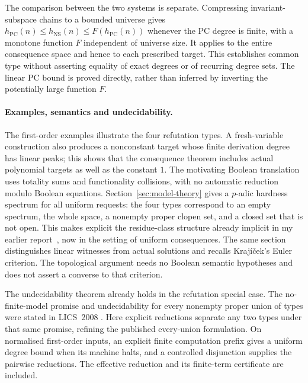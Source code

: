 \documentclass[11pt,a4paper]{article}
\theoremstyle{definition}\newtheorem{definition}[theorem]{Definition}
\theoremstyle{remark}\newtheorem{remark}[theorem]{Remark}
\newcommand{\NS}{\mathrm{NS}}\newcommand{\PC}{\mathrm{PC}}
\begin{document}
The comparison between the two systems is separate. Compressing
invariant-subspace chains to a bounded universe gives
$h_{\PC}(n)\le h_{\NS}(n)\le F(h_{\PC}(n))$ whenever the PC
degree is finite, with a monotone function $F$ independent of
universe size. It applies to
the entire consequence space and hence to each prescribed target.
This establishes common type without asserting equality of exact
degrees or of recurring degree sets. The linear PC bound is proved
directly, rather than inferred by inverting the potentially large
function $F$.

\paragraph{Examples, semantics and undecidability.}
The first-order examples illustrate the four refutation types. A
fresh-variable construction also produces a nonconstant target
whose finite derivation degree has linear peaks; this shows that
the consequence theorem includes actual polynomial targets as well
as the constant $1$. The motivating Boolean translation uses
totality sums and functionality collisions, with no automatic
reduction modulo Boolean equations. Section~\ref{sec:model-theory} gives a $p$-adic hardness spectrum for
all uniform requests: the four types correspond to an empty spectrum,
the whole space, a nonempty proper clopen set, and a closed set that is
not open. This makes explicit the residue-class structure already
implicit in my earlier report~\cite[Section~4]{RiisLong}, now in the
setting of uniform consequences. The same section distinguishes
linear witnesses from actual solutions and recalls Kraj\'i\v cek's
Euler criterion. The topological argument needs no Boolean semantic
hypotheses and does not assert a converse to that criterion.

The undecidability theorem already holds in the refutation special
case. The no-finite-model promise and undecidability for every
nonempty proper union of types were stated in LICS~2008
\cite[Theorem~1]{Riis}. Here explicit reductions separate any two
types under that same promise, refining the published every-union
formulation. On normalised first-order inputs, an explicit finite
computation prefix gives a uniform degree bound when its machine
halts, and a controlled disjunction supplies the pairwise reductions.
The effective reduction and its finite-term certificate are included.
\end{document}
